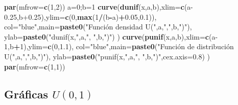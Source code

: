 \documentclass[]{book}
\newenvironment{Shaded}{\begin{snugshade}}{\end{snugshade}}
\newcommand{\DataTypeTok}[1]{\textcolor[rgb]{0.13,0.29,0.53}{#1}}
\newcommand{\DecValTok}[1]{\textcolor[rgb]{0.00,0.00,0.81}{#1}}
\newcommand{\FloatTok}[1]{\textcolor[rgb]{0.00,0.00,0.81}{#1}}
\newcommand{\KeywordTok}[1]{\textcolor[rgb]{0.13,0.29,0.53}{\textbf{#1}}}
\newcommand{\NormalTok}[1]{#1}
\newcommand{\OperatorTok}[1]{\textcolor[rgb]{0.81,0.36,0.00}{\textbf{#1}}}
\newcommand{\StringTok}[1]{\textcolor[rgb]{0.31,0.60,0.02}{#1}}
\begin{document}
\begin{Shaded}
\begin{Highlighting}[]
\KeywordTok{par}\NormalTok{(}\DataTypeTok{mfrow=}\KeywordTok{c}\NormalTok{(}\DecValTok{1}\NormalTok{,}\DecValTok{2}\NormalTok{))}
\NormalTok{a=}\DecValTok{0}\NormalTok{;b=}\DecValTok{1}
\KeywordTok{curve}\NormalTok{(}\KeywordTok{dunif}\NormalTok{(x,a,b),}\DataTypeTok{xlim=}\KeywordTok{c}\NormalTok{(a}\FloatTok{-0.25}\NormalTok{,b}\FloatTok{+0.25}\NormalTok{),}\DataTypeTok{ylim=}\KeywordTok{c}\NormalTok{(}\DecValTok{0}\NormalTok{,}\KeywordTok{max}\NormalTok{(}\DecValTok{1}\OperatorTok{/}\NormalTok{(b}\OperatorTok{-}\NormalTok{a)}\OperatorTok{+}\FloatTok{0.05}\NormalTok{,}\FloatTok{0.1}\NormalTok{)),}
      \DataTypeTok{col=}\StringTok{"blue"}\NormalTok{,}\DataTypeTok{main=}\KeywordTok{paste0}\NormalTok{(}\StringTok{"Función densidad  U("}\NormalTok{,a,}\StringTok{","}\NormalTok{,b,}\StringTok{")"}\NormalTok{),}
      \DataTypeTok{ylab=}\KeywordTok{paste0}\NormalTok{(}\StringTok{"dunif(x,"}\NormalTok{,a,}\StringTok{", "}\NormalTok{,b,}\StringTok{")"}\NormalTok{)}
\NormalTok{      )}
\KeywordTok{curve}\NormalTok{(}\KeywordTok{punif}\NormalTok{(x,a,b),}\DataTypeTok{xlim=}\KeywordTok{c}\NormalTok{(a}\DecValTok{-1}\NormalTok{,b}\OperatorTok{+}\DecValTok{1}\NormalTok{),}\DataTypeTok{ylim=}\KeywordTok{c}\NormalTok{(}\DecValTok{0}\NormalTok{,}\FloatTok{1.1}\NormalTok{),}
      \DataTypeTok{col=}\StringTok{"blue"}\NormalTok{,}\DataTypeTok{main=}\KeywordTok{paste0}\NormalTok{(}\StringTok{"Función de distribución U("}\NormalTok{,a,}\StringTok{","}\NormalTok{,b,}\StringTok{")"}\NormalTok{),}
      \DataTypeTok{ylab=}\KeywordTok{paste0}\NormalTok{(}\StringTok{"punif(x,"}\NormalTok{,a,}\StringTok{", "}\NormalTok{,b,}\StringTok{")"}\NormalTok{,}\DataTypeTok{cex.axis=}\FloatTok{0.8}\NormalTok{)}
\NormalTok{      )}
\KeywordTok{par}\NormalTok{(}\DataTypeTok{mfrow=}\KeywordTok{c}\NormalTok{(}\DecValTok{1}\NormalTok{,}\DecValTok{1}\NormalTok{))}
\end{Highlighting}
\end{Shaded}

\hypertarget{gruxe1ficas-u01-1}{%
\subsection{\texorpdfstring{Gráficas \(U(0,1)\)}{Gráficas U(0,1)}}\label{gruxe1ficas-u01-1}}
\end{document}

